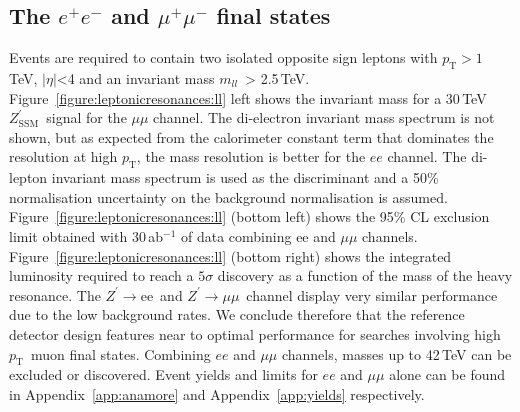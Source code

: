 \documentclass[a4paper,11pt]{article}
\newcommand{\ZpSSM}{\ensuremath{Z^{\prime}_{\mathrm{SSM}}}}
\newcommand*{\Zpee}{\ensuremath{Z^{\prime}\rightarrow \text{ee}}}
\newcommand*{\Zpmumu}{\ensuremath{Z^{\prime}\rightarrow \mu\mu}}
\newcommand{\pt}{\ensuremath{p_{\text{T}}}}
\newcommand{\mll}{\ensuremath{m_{\ensuremath{ll}}}}
\newcommand*{\ee}{\ensuremath{e^{+}e^{-}}}
\newcommand*{\mumu}{\ensuremath{\mu^{+}\mu^{-}}}
\begin{document}
\subsection{The \texorpdfstring{\ee}{ee} and \texorpdfstring{\mumu}{mumu} final states}
\label{sec:lepee}

Events are required to contain two isolated opposite sign leptons with $\pt > 1$\,TeV, $|\eta|$<4 and an invariant mass \mll\ > 2.5\,TeV.
Figure~\ref{figure:leptonicresonances:ll} left shows the invariant mass for a 30\,TeV \ZpSSM\ signal for the $\mu\mu$ channel. The di-electron invariant mass spectrum is not shown, but as expected from the calorimeter constant term that dominates the resolution at high \pt, the mass resolution is better for the $ee$ channel.
The di-lepton invariant mass spectrum is used as the discriminant and a 50\% normalisation uncertainty on the background normalisation is assumed.
Figure~\ref{figure:leptonicresonances:ll} (bottom left) shows the 95\% CL exclusion limit obtained with 30\,ab$^{-1}$ of data combining ee and $\mu\mu$ channels. Figure~\ref{figure:leptonicresonances:ll} (bottom right) shows the integrated luminosity required to reach a $5\sigma$ discovery as a function of the mass of the heavy resonance. The \Zpee\ and \Zpmumu\ channel display very similar performance due to the low background rates. We conclude therefore that the reference detector design features near to optimal performance for searches involving high \pt\ muon final states. Combining $ee$ and $\mu\mu$ channels, masses up to 42\,TeV can be excluded or discovered. Event yields and limits for $ee$ and $\mu\mu$ alone can be found in Appendix~\ref{app:anamore} and Appendix~\ref{app:yields} respectively.
\end{document}
